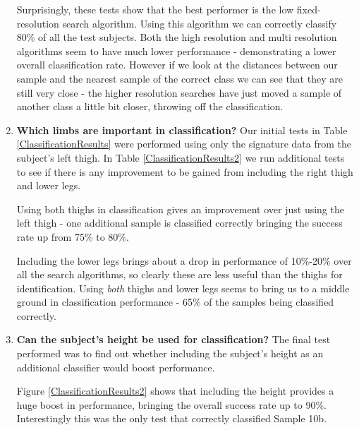 \begin{enumerate}
		Surprisingly, these tests show that the best performer is the low fixed-resolution search algorithm.
		Using this algorithm we can correctly classify 80\% of all the test subjects.
		Both the high resolution and multi resolution algorithms seem to have much lower performance - demonstrating a lower overall classification rate.
		However if we look at the distances between our sample and the nearest sample of the correct class we can see that they are still very close - the higher resolution searches
		have just moved a sample of another class a little bit closer, throwing off the classification.
		
	\item \textbf{Which limbs are important in classification?}
		Our initial tests in Table \ref{ClassificationResults} were performed using only the signature data from the subject's left thigh.
		In Table \ref{ClassificationResults2} we run additional tests to see if there is any improvement to be gained from including the right thigh and lower legs.
		
		Using both thighs in classification gives an improvement over just using the left thigh - one additional sample is classified correctly bringing the success rate up from 75\% to 80\%.
		
		Including the lower legs brings about a drop in performance of 10\%-20\% over all the search algorithms, so clearly these are less useful than the thighs for identification.
		Using \emph{both} thighs and lower legs seems to bring us to a middle ground in classification performance - 65\% of the samples being classified correctly.
	
	\item \textbf{Can the subject's height be used for classification?}
		The final test performed was to find out whether including the subject's height as an additional classifier would boost performance.
		
		Figure \ref{ClassificationResults2} shows that including the height provides a huge boost in performance, bringing the overall success rate up to 90\%.
		Interestingly this was the only test that correctly classified Sample 10b.
\end{enumerate}

